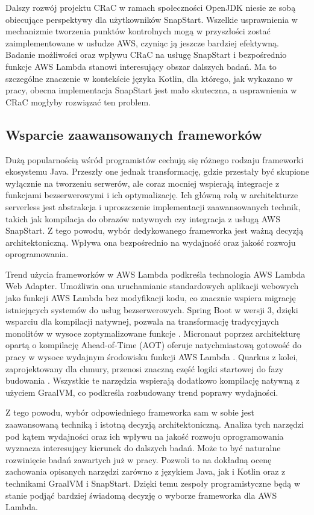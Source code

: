Dalszy rozwój projektu CRaC w ramach społeczności OpenJDK niesie ze sobą obiecujące perspektywy dla użytkowników SnapStart. 
Wszelkie usprawnienia w mechanizmie tworzenia punktów kontrolnych mogą w przyszłości zostać zaimplementowane w usłudze AWS, czyniąc ją jeszcze bardziej efektywną.
Badanie możliwości oraz wpływu CRaC na usługę SnapStart i bezpośrednio funkcje AWS Lambda stanowi interesujący obszar dalszych badań.
Ma to szczególne znaczenie w kontekście języka Kotlin, dla którego, jak wykazano w pracy, obecna implementacja SnapStart jest mało skuteczna, a usprawnienia w CRaC mogłyby rozwiązać ten problem.

\subsection*{Wsparcie zaawansowanych frameworków}

Dużą popularnością wśród programistów cechują się różnego rodzaju frameworki ekosystemu Java.
Przeszły one jednak transformację, gdzie przestały być skupione wyłącznie na tworzeniu serwerów, ale coraz mocniej wspierają integracje z funkcjami bezserwerowymi i ich optymalizację.
Ich główną rolą w architekturze serverless jest abstrakcja i uproszczenie implementacji zaawansowanych technik, takich jak kompilacja do obrazów natywnych czy integracja z usługą AWS SnapStart.
Z tego powodu, wybór dedykowanego frameworka jest ważną decyzją architektoniczną.
Wpływa ona bezpośrednio na wydajność oraz jakość rozwoju oprogramowania.

Trend użycia frameworków w AWS Lambda podkreśla technologia AWS Lambda Web Adapter.
Umożliwia ona uruchamianie standardowych aplikacji webowych jako funkcji AWS Lambda bez modyfikacji kodu, co znacznie wspiera migrację istniejących systemów do usług bezserwerowych.
Spring Boot w wersji 3, dzięki wsparciu dla kompilacji natywnej, pozwala na transformację tradycyjnych monolitów w wysoce zoptymalizowane funkcje \cite{spring_cloud_function_2025}.
Micronaut poprzez architekturę opartą o kompilację Ahead-of-Time (AOT) oferuje natychmiastową gotowość do pracy w wysoce wydajnym środowisku funkcji AWS Lambda \cite{micronaut_docs_2025}.
Quarkus z kolei, zaprojektowany dla chmury, przenosi znaczną część logiki startowej do fazy budowania \cite{quarkus-docs}.
Wszystkie te narzędzia wspierają dodatkowo kompilację natywną z użyciem GraalVM, co podkreśla rozbudowany trend poprawy wydajności.

Z tego powodu, wybór odpowiedniego frameworka sam w sobie jest zaawansowaną techniką i istotną decyzją architektoniczną. 
Analiza tych narzędzi pod kątem wydajności oraz ich wpływu na jakość rozwoju oprogramowania wyznacza interesujący kierunek do dalszych badań.
Może to być naturalne rozwinięcie badań zawartych już w pracy.
Pozwoli to na dokładną ocenę zachowania opisanych narzędzi zarówno z językiem Java, jak i Kotlin oraz z technikami GraalVM i SnapStart.
Dzięki temu zespoły programistyczne będą w stanie podjąć bardziej świadomą decyzję o wyborze frameworka dla AWS Lambda.

